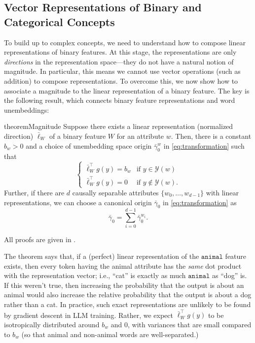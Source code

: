 \documentclass{article}
\newcommand{\ConceptName}[1]{$\mathtt{#1}$}
\newcommand{\yquad}{\mathcal{Y}}
\begin{document}
\subsection{Vector Representations of Binary and Categorical Concepts}
To build up to complex concepts, we need to understand how to compose linear representations of binary features.
At this stage, the representations are only \emph{directions} in the representation space---they do not have a natural notion of magnitude. In particular, this means we cannot use vector operations (such as addition) to compose representations. To overcome this, we now show how to associate a magnitude to the linear representation of a binary feature.
The key is the following result, which connects binary feature representations and word unembeddings:
\begin{restatable}{theorem}{Magnitude}\label{thm:magnitude}
  Suppose there exists a linear representation (normalized direction) $\bar\ell_W$ of a binary feature $W$ for an attribute $w$.  
  Then, there is a constant $b_w>0$ and a choice of unembedding space origin $\bar{\gamma}_0^w$ in \cref{eq:transformation} such that
  \begin{equation}\label{eq:magnitude}
    \begin{cases}
      \bar\ell_W^\top g(y) = b_w & \text{if } y\in \yquad(w)\\
      \bar\ell_W^\top g(y) = 0 & \text{if } y \not\in \yquad(w).
    \end{cases}
  \end{equation}
  Further, if there are $d$ causally separable attributes $\{w_0, \dots, w_{d-1}\}$ with linear representations, we can choose a canonical origin $\bar\gamma_0$ in \cref{eq:transformation} as
  \begin{equation}
    \bar\gamma_0 = \sum_{i=0}^{d-1} \bar{\gamma}_0^{w_i}.
  \end{equation}
\end{restatable}
All proofs are given in .

The theorem says that, if a (perfect) linear representation of the \ConceptName{animal} feature exists, then every token having the animal attribute has the \emph{same} dot product with the representation vector; i.e., ``cat'' is exactly as much \ConceptName{animal} as ``dog'' is. If this weren't true, then increasing the probability that the output is about an animal would also increase the relative probability that the output is about a dog rather than a cat.
In practice, such exact representations are unlikely to be found by gradient descent in LLM training. Rather, we expect $\bar\ell_W^\top g(y)$ to be isotropically distributed around $b_w$ and $0$, with variances that are small compared to $b_w$ (so that animal and non-animal words are well-separated.)
\end{document}

